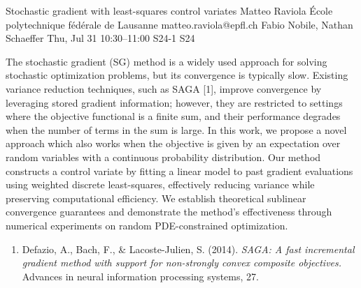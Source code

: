 \begin{talk}
  {Stochastic gradient with least-squares control variates}%
  {Matteo Raviola}%
  {\'Ecole polytechnique f\'ed\'erale de Lausanne}%
  {matteo.raviola@epfl.ch}%
  {Fabio Nobile, Nathan Schaeffer}%
  {}%
  {Thu, Jul 31 10:30--11:00}%
  {S24-1}%
  {S24}%
  
  
  
  The stochastic gradient (SG) method is a widely used approach for solving stochastic optimization problems, but its convergence is typically slow.
  Existing variance reduction techniques, such as SAGA [1], improve convergence by leveraging stored gradient information; however, they are restricted to settings where the objective functional is a finite sum, and their performance degrades when the number of terms in the sum is large.
  In this work, we propose a novel approach which also works when the objective is given by an expectation over random variables with a continuous probability distribution.
  Our method constructs a control variate by fitting a linear model to past gradient evaluations using weighted discrete least-squares, effectively reducing variance while preserving computational efficiency.
  We establish theoretical sublinear convergence guarantees and demonstrate the method's effectiveness through numerical experiments on random PDE-constrained optimization.
  
  \medskip
  
  \begin{enumerate}
    \item[{[1]}] Defazio, A., Bach, F., \& Lacoste-Julien, S. (2014). {\it SAGA: A fast incremental gradient method with support for non-strongly convex composite objectives.} Advances in neural information processing systems, 27.
  \end{enumerate}
  
\end{talk}

